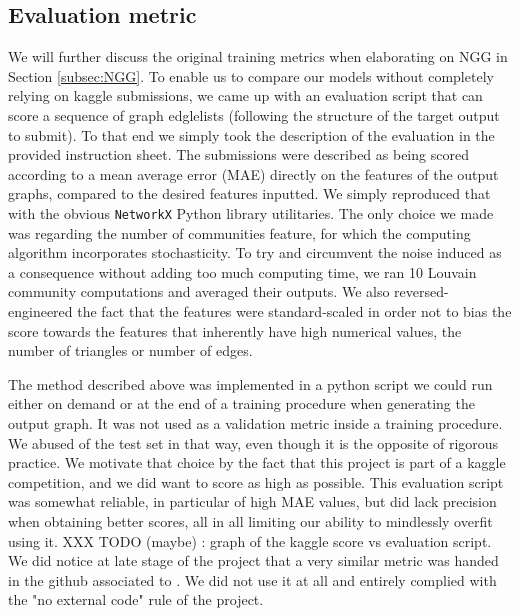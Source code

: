 \documentclass[10pt,twocolumn,letterpaper]{article}
\begin{document}
\subsection{Evaluation metric}
\label{subsec:eval}
We will further discuss the original training metrics when elaborating on NGG in Section \ref{subsec:NGG}. To enable us to compare our models without completely relying on kaggle submissions, we came up with an evaluation script that can score a sequence of graph edglelists (following the structure of the target output to submit). To that end we simply took the description of the evaluation in the provided instruction sheet. The submissions were described as being scored according to a mean average error (MAE) directly on the features of the output graphs, compared to the desired features inputted. We simply reproduced that with the obvious {\tt NetworkX} Python library utilitaries. The only choice we made was regarding the number of communities feature, for which the computing algorithm incorporates stochasticity. To try and circumvent the noise induced as a consequence without adding too much computing time, we ran 10 Louvain community computations and averaged their outputs. We also reversed-engineered the fact that the features were standard-scaled in order not to bias the score towards the features that inherently have high numerical values, \eg the number of triangles or number of edges.

\noindent
The method described above was implemented in a python script we could run either on demand or at the end of a training procedure when generating the output graph. It was not used as a validation metric inside a training procedure. We abused of the test set in that way, even though it is the opposite of rigorous practice. We motivate that choice by the fact that this project is part of a kaggle competition, and we did want to score as high as possible. This evaluation script was somewhat reliable, in particular of high MAE values, but did lack precision when obtaining better scores, all in all limiting our ability to mindlessly overfit using it. XXX TODO (maybe) : graph of the kaggle score vs evaluation script.
\noindent
We did notice at late stage of the project that a very similar metric was handed in the github associated to \cite{evdaimon2024neuralgraphgeneratorfeatureconditioned}. We did not use it at all and entirely complied with the "no external code" rule of the project.
\end{document}
